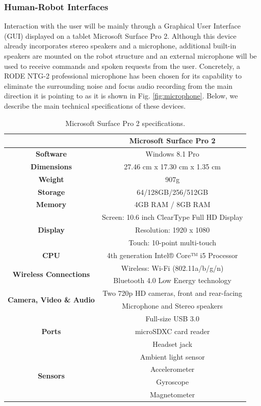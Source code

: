 \subsubsection{Human-Robot Interfaces}
Interaction with the user will be mainly through a Graphical User
Interface (GUI) displayed on a tablet Microsoft Surface Pro 2.
Although this device already incorporates stereo speakers and a
microphone, additional built-in speakers are mounted on the robot
structure and an external microphone will be used to receive commands
and spoken requests from the user. Concretely, a RODE NTG-2
professional microphone has been chosen for its capability to
eliminate the surrounding noise and focus audio recording from the main direction it is pointing to
as it is shown in Fig. \ref{fig:microphone}.
Below, we describe the main technical specifications of these devices.

\begin{table}[h]
\begin{center}
\begin{tabular}{|c|c|}
\hline
& \bf{Microsoft Surface Pro 2} \\
\hline \bf{Software} & Windows 8.1 Pro \\
\hline \bf{Dimensions} & 27.46 cm x 17.30 cm x 1.35 cm \\
\hline \bf{Weight} & 907g \\
\hline \bf{Storage} &  64/128GB/256/512GB \\
\hline \bf{Memory} & 4GB RAM  /    8GB RAM \\
\hline \multirow{3}{*}{\bf{Display}}
& Screen: 10.6 inch ClearType Full HD Display \\
& Resolution: 1920 x 1080 \\
& Touch: 10-point multi-touch \\
\hline \bf{CPU}  & 4th generation Intel® Core™ i5 Processor \\
\hline \multirow{2}{*}{\bf{Wireless Connections}} 
& Wireless: Wi-Fi (802.11a/b/g/n) \\
& Bluetooth 4.0 Low Energy technology \\
\hline \multirow{2}{*}{\bf{Camera, Video \& Audio}}  
& Two 720p HD cameras, front and rear-facing \\
& Microphone and Stereo speakers \\
\hline \multirow{3}{*}{\bf{Ports}} 
& Full-size USB 3.0 \\
& microSDXC card reader \\
& Headset jack \\
\hline \multirow{4}{*}{\bf{Sensors}}
& Ambient light sensor \\
& Accelerometer \\
& Gyroscope \\
& Magnetometer \\
\hline
\end{tabular}
\end{center}
\caption{Microsoft Surface Pro 2 specifications.}
\end{table}

